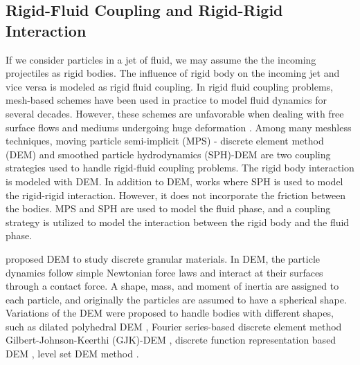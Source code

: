 \subsection{Rigid-Fluid Coupling and Rigid-Rigid Interaction}
If we consider particles in a jet of fluid, we may assume the the incoming
projectiles as rigid bodies. The influence of rigid body on the incoming jet and
vice versa is modeled as rigid fluid coupling. In rigid fluid coupling problems,
mesh-based schemes \citep{dettmer_computational_2006} have been used in practice
to model fluid dynamics for several decades. However, these schemes are
unfavorable when dealing with free surface flows and mediums undergoing huge
deformation \citep{walkley_finite_2005}. Among many meshless techniques, moving
particle semi-implicit (MPS) - discrete element method (DEM)
\citep{guo2017numerical} and smoothed particle hydrodynamics (SPH)-DEM
\citep{canelas2016sph} are two coupling strategies used to handle rigid-fluid
coupling problems. The rigid body interaction is modeled with DEM. In addition
to DEM, works where SPH \citep{amicarelli2015smoothed} is used to model the
rigid-rigid interaction. However, it does not incorporate the friction between
the bodies. MPS and SPH are used to model the fluid phase, and a coupling
strategy is utilized to model the interaction between the rigid body and the
fluid phase.

\cite{cundall_discrete_1979} proposed DEM to study discrete granular materials.
In DEM, the particle dynamics follow simple Newtonian force laws and interact at
their surfaces through a contact force. A shape, mass, and moment of inertia are
assigned to each particle, and originally the particles are assumed to have a
spherical shape. Variations of the DEM were proposed to handle bodies with
different shapes, such as dilated polyhedral DEM \citep{liu_new_2020}, Fourier
series-based discrete element method \citep{lai_fourier_2020}
Gilbert-Johnson-Keerthi (GJK)-DEM \citep{wachs2012grains3d}, discrete function
representation based DEM \citep{lu2012critical}, level set DEM method
\citep{duriez2021precision}.

